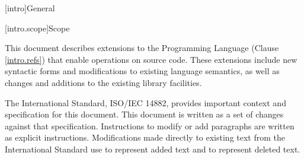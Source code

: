 
[intro]{General}

[intro.scope]{Scope}

\pnum
This document describes extensions to the \Cpp Programming
Language (Clause \ref{intro.refs}) that enable operations on source code. These
extensions include new syntactic forms and modifications to existing language
semantics, as well as changes and additions to the existing library facilities.

\pnum
The International Standard, ISO/IEC 14882, provides important context and
specification for this document.  This document is written as a
set of changes against that specification.  Instructions to modify or add
paragraphs are written as explicit instructions.  Modifications made directly to
existing text from the International Standard use  to
represent added text and  to represent deleted text.
